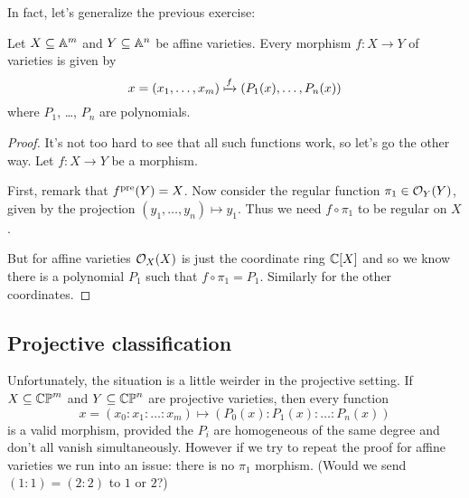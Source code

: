 In fact, let's generalize the previous exercise:
\begin{theorem}
	Let $X \subseteq \mathbb A^m$ and $Y \subseteq \mathbb A^n$ be affine varieties.
	Every morphism $f : X \to Y$ of varieties is given by
	\[
		x = \left( x_1, \dots, x_m \right)
		\xmapsto{f} \left( P_1(x), \dots, P_n(x) \right)
	\]
	where $P_1$, \dots, $P_n$ are polynomials.
	\label{thm:affine_global_polynomial}
\end{theorem}
\begin{proof}
	It's not too hard to see that all such functions work,
	so let's go the other way.
	Let $f : X \to Y$ be a morphism.

	First, remark that $f^{\text{pre}}(Y) = X$.
	Now consider the regular function $\pi_1 \in \mathcal O_Y(Y)$,
	given by the projection $(y_1, \dots, y_n) \mapsto y_1$.
	Thus we need $f \circ \pi_1$ to be regular on $X$.

	But for affine varieties $\mathcal O_X(X)$ is just the coordinate ring $\mathbb C[X]$
	and so we know there is a polynomial $P_1$ such that $f \circ \pi_1 = P_1$.
	Similarly for the other coordinates.
\end{proof}

\subsection{Projective classification}
Unfortunately, the situation is a little weirder in the projective setting.
If $X \subseteq \mathbb{CP}^m$ and $Y \subseteq \mathbb{CP}^n$ are projective varieties,
then every function
\[
	x = \left( x_0 : x_1 : \dots : x_m \right)
	\mapsto \left( P_0(x) : P_1(x) : \dots : P_n(x) \right)
\]
is a valid morphism, provided the $P_i$ are homogeneous
of the same degree and don't all vanish simultaneously.
However if we try to repeat the proof for affine varieties
we run into an issue: there is no $\pi_1$ morphism.
(Would we send $(1:1) = (2:2)$ to $1$ or $2$?)

